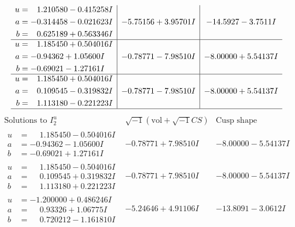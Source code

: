\documentclass[1p]{elsarticle_modified}
\theoremstyle{definition}
\newcommand{\I}{\sqrt{-1}}
\begin{document}
$$\begin{array}{c|c|c}
\begin{aligned}
u &= \phantom{-}1.210580 - 0.415258 I \\
a &= -0.314458 - 0.021623 I \\
b &= \phantom{-}0.625189 + 0.563346 I\end{aligned}
 & -5.75156 + 3.95701 I & -14.5927 - 3.7511 I \\ \hline\begin{aligned}
u &= \phantom{-}1.185450 + 0.504016 I \\
a &= -0.94362 + 1.05600 I \\
b &= -0.69021 - 1.27161 I\end{aligned}
 & -0.78771 - 7.98510 I & -8.00000 + 5.54137 I \\ \hline\begin{aligned}
u &= \phantom{-}1.185450 + 0.504016 I \\
a &= \phantom{-}0.109545 - 0.319832 I \\
b &= \phantom{-}1.113180 - 0.221223 I\end{aligned}
 & -0.78771 - 7.98510 I & -8.00000 + 5.54137 I\\
 \hline 
 \end{array}$$\newpage$$\begin{array}{c|c|c}  
\text{Solutions to }I^u_{2}& \I (\text{vol} + \sqrt{-1}CS) & \text{Cusp shape}\\
 \hline 
\begin{aligned}
u &= \phantom{-}1.185450 - 0.504016 I \\
a &= -0.94362 - 1.05600 I \\
b &= -0.69021 + 1.27161 I\end{aligned}
 & -0.78771 + 7.98510 I & -8.00000 - 5.54137 I \\ \hline\begin{aligned}
u &= \phantom{-}1.185450 - 0.504016 I \\
a &= \phantom{-}0.109545 + 0.319832 I \\
b &= \phantom{-}1.113180 + 0.221223 I\end{aligned}
 & -0.78771 + 7.98510 I & -8.00000 - 5.54137 I \\ \hline\begin{aligned}
u &= -1.200000 + 0.486246 I \\
a &= \phantom{-}0.93326 + 1.06775 I \\
b &= \phantom{-}0.720212 - 1.161810 I\end{aligned}
 & -5.24646 + 4.91106 I & -13.8091 - 3.0612 I \\ \hline\begin{aligned}

\end{aligned}
\end{array}$$
\end{document}
